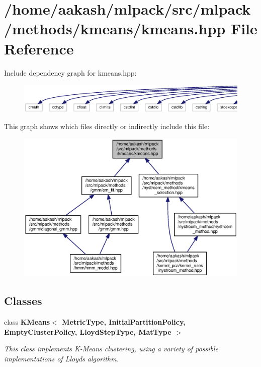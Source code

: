 \section{/home/aakash/mlpack/src/mlpack/methods/kmeans/kmeans.hpp File Reference}
\label{kmeans_8hpp}
Include dependency graph for kmeans.\+hpp\+:
\nopagebreak
\begin{figure}[H]
\begin{center}
\leavevmode
\includegraphics[width=350pt]{kmeans_8hpp__incl}
\end{center}
\end{figure}
This graph shows which files directly or indirectly include this file\+:
\nopagebreak
\begin{figure}[H]
\begin{center}
\leavevmode
\includegraphics[width=350pt]{kmeans_8hpp__dep__incl}
\end{center}
\end{figure}
\subsection*{Classes}
\begin{DoxyCompactItemize}
\item 
class \textbf{ K\+Means$<$ Metric\+Type, Initial\+Partition\+Policy, Empty\+Cluster\+Policy, Lloyd\+Step\+Type, Mat\+Type $>$}
\begin{DoxyCompactList}\small\item\em This class implements K-\/\+Means clustering, using a variety of possible implementations of Lloyd\textquotesingle{}s algorithm. \end{DoxyCompactList}\end{DoxyCompactItemize}
